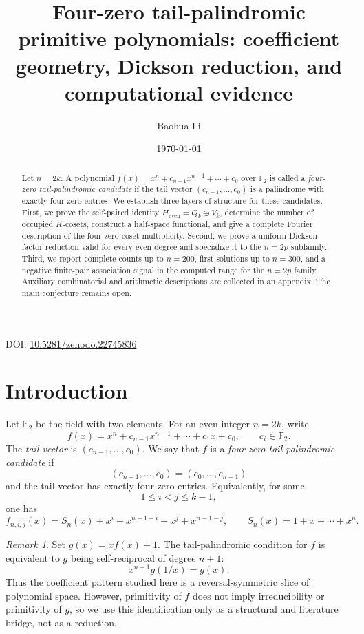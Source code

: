 \documentclass[11pt]{article}
\title{Four-zero tail-palindromic primitive polynomials: coefficient geometry, Dickson reduction, and computational evidence}
\author{Baohua Li}
\date{\today}
\theoremstyle{definition}
\theoremstyle{remark}
\newtheorem{remark}[theorem]{Remark}
\begin{document}
\maketitle

\begin{center}
\small DOI: \href{https://doi.org/10.5281/zenodo.22745836}{10.5281/zenodo.22745836}
\end{center}

\begin{abstract}
Let \(n=2k\). A polynomial \(f(x)=x^n+c_{n-1}x^{n-1}+\cdots+c_0\) over \(\mathbb F_2\) is called a \emph{four-zero tail-palindromic candidate} if the tail vector \((c_{n-1},\ldots,c_0)\) is a palindrome with exactly four zero entries. We establish three layers of structure for these candidates. First, we prove the self-paired identity \(H_{\mathrm{even}}=Q_k\oplus V_k\), determine the number of occupied \(K\)-cosets, construct a half-space functional, and give a complete Fourier description of the four-zero coset multiplicity. Second, we prove a uniform Dickson-factor reduction valid for every even degree and specialize it to the \(n=2p\) subfamily. Third, we report complete counts up to \(n=200\), first solutions up to \(n=300\), and a negative finite-pair association signal in the computed range for the \(n=2p\) family. Auxiliary combinatorial and arithmetic descriptions are collected in an appendix. The main conjecture remains open.
\end{abstract}

\section{Introduction}\label{sec:intro}

Let $\mathbb F_2$ be the field with two elements. For an even integer $n=2k$, write
\[
f(x)=x^n+c_{n-1}x^{n-1}+\cdots+c_1x+c_0,\qquad c_i\in\mathbb F_2.
\]
The \emph{tail vector} is $(c_{n-1},\ldots,c_0)$. We say that $f$ is a \emph{four-zero tail-palindromic candidate} if
\[
(c_{n-1},\ldots,c_0)=(c_0,\ldots,c_{n-1})
\]
and the tail vector has exactly four zero entries. Equivalently, for some
\[
1\le i<j\le k-1,
\]
one has
\begin{equation}\label{eq:candidate}
f_{n,i,j}(x)
=
S_n(x)+x^i+x^{n-1-i}+x^j+x^{n-1-j},
\qquad
S_n(x)=1+x+\cdots+x^n.
\end{equation}

\begin{remark}\label{rem:selfreciprocal}
Set \(g(x)=xf(x)+1\). The tail-palindromic condition for \(f\) is equivalent to \(g\) being self-reciprocal of degree \(n+1\):
\[
x^{n+1}g(1/x)=g(x).
\]
Thus the coefficient pattern studied here is a reversal-symmetric slice of polynomial space. However, primitivity of \(f\) does not imply irreducibility or primitivity of \(g\), so we use this identification only as a structural and literature bridge, not as a reduction.
\end{remark}
\end{document}
